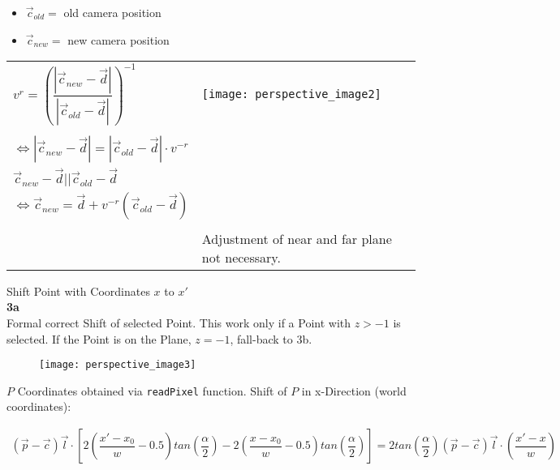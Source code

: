 \begin{itemize}
	\item[]	$\overrightarrow{c}_{old} = $ old camera position
	\item[]	$\overrightarrow{c}_{new} = $ new camera position
\end{itemize}
 \begin{table}[h!]
 	\begin{tabular}{p{5cm}p{6cm}}
 		$ v^{r} = \left(\dfrac{|\overrightarrow{c}_{new} - \overrightarrow{d}|}{|\overrightarrow{c}_{old} - \overrightarrow{d}| }\right)^{-1}$  &  \parbox[c]{2em}{ \texttt{[image: perspective\_image2]} }\\
 		 &\\
 		$\Leftrightarrow  |\overrightarrow{c}_{new} - \overrightarrow{d}| = |\overrightarrow{c}_{old} - \overrightarrow{d}| \cdot v^{-r} $ & \\
 		$\overrightarrow{c}_{new} - \overrightarrow{d} ||\overrightarrow{c}_{old} - \overrightarrow{d} $ & \\
 		$\Leftrightarrow \boxed{\overrightarrow{c}_{new} =  \overrightarrow{d} + v^{-r}\left(\overrightarrow{c}_{old} - \overrightarrow{d}\right) }$  & \\
		& 		\centerline{} \par  \\
		& 		\centerline{Adjustment of near and far plane not necessary.} \par  \\
 	\end{tabular}
 \end{table}

Shift Point with Coordinates $x$ to $x'$ \\

\noindent\textbf{3a} \\
Formal correct Shift of selected Point. This work only if a Point with $z > -1$ is selected. If the Point is on the Plane, $z = -1$, fall-back to 3b.

\begin{figure}[h!]
	\centering
	\texttt{[image: perspective\_image3]}	
\end{figure}
$P$ Coordinates obtained via \verb|readPixel| function.	 
Shift of $P$ in x-Direction (world coordinates):

\begin{align*}\left(\overrightarrow{p} - \overrightarrow{c}\right)\overrightarrow{l} \cdot \left[2\left(\dfrac{x' - x_{0}}{w} - 0.5\right)tan\left(\dfrac{\alpha}{2}\right) - 2\left(\dfrac{x - x_{0}}{w} - 0.5\right)tan\left(\dfrac{\alpha}{2} \right)\right] = 2tan\left(\dfrac{\alpha}{2}\right)\left(\overrightarrow{p} - \overrightarrow{c}\right) \overrightarrow{l} \cdot \left(\dfrac{x' - x}{w} \right) 	\end{align*}

